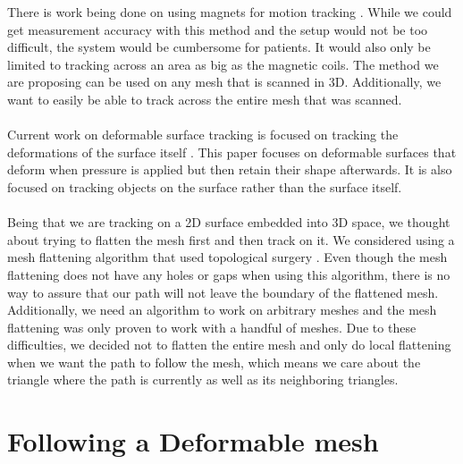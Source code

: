 \documentclass[conference]{acmsiggraph}
\begin{document}
There is work being done on using magnets for motion tracking \cite{magnetictracking}. While we could get measurement accuracy with this method and the setup would not be too difficult, the system would be cumbersome for patients. It would also only be limited to tracking across an area as big as the magnetic coils. The method we are proposing can be used on any mesh that is scanned in 3D. Additionally, we want to easily be able to track across the entire mesh that was scanned.\\
\\
Current work on deformable surface tracking is focused on tracking the deformations of the surface itself \cite{deformableobjecttracking,convexopt}. This paper focuses on deformable surfaces that deform when pressure is applied but then retain their shape afterwards. It is also focused on tracking objects on the surface rather than the surface itself.\\
\\
Being that we are tracking on a 2D surface embedded into 3D space, we thought about trying to flatten the mesh first and then track on it. We considered using a mesh flattening algorithm that used topological surgery \cite{meshunfolding}. Even though the mesh flattening does not have any holes or gaps when using this algorithm, there is no way to assure that our path will not leave the boundary of the flattened mesh. Additionally, we need an algorithm to work on arbitrary meshes and the mesh flattening was only proven to work with a handful of meshes. Due to these difficulties, we decided not to flatten the entire mesh and only do local flattening when we want the path to follow the mesh, which means we care about the triangle where the path is currently as well as its neighboring triangles. 

\section{Following a Deformable mesh}
\end{document}

